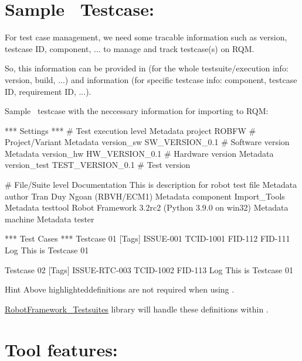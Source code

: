 \hypertarget{description-sample-robotframework-testcase}{%
\section{Sample \rfwcore\ Testcase:}
\label{description-sample-robotframework-testcase}}

For test case management, we need some tracable information such as
version, testcase ID, component, ... to manage and track testcase(s) on
RQM.

So, this information can be provided in  (for the whole
testsuite/execution info: version, build, ...) and \rcode{{[}Tags{]}}
information (for specific testcase info: component, testcase ID,
requirement ID, ...).

Sample \rfwcore\ testcase with the neccessary information for importing to
RQM:

\begin{robotcode}[caption=Sample \rfwcore\ testcase,
                  linebackgroundcolor=\hlcode{3,4,5,6,12,13,14}]
*** Settings ***
# Test execution level
Metadata   project        ROBFW              # Project/Variant
Metadata   version_sw     SW_VERSION_0.1     # Software version
Metadata   version_hw     HW_VERSION_0.1     # Hardware version
Metadata   version_test   TEST_VERSION_0.1   # Test version

# File/Suite level
Documentation             This is description for robot test file
Metadata    author        Tran Duy Ngoan (RBVH/ECM1)
Metadata    component     Import_Tools
Metadata    testtool      Robot Framework 3.2rc2 (Python 3.9.0 on win32)
Metadata    machine       %
Metadata    tester        %

*** Test Cases ***
Testcase 01
   [Tags]   ISSUE-001   TCID-1001   FID-112   FID-111
   Log       This is Testcase 01

Testcase 02
   [Tags]   ISSUE-RTC-003   TCID-1002   FID-113
   Log       This is Testcase 01
\end{robotcode}

\begin{boxhint} {Hint}
Above highlighteddefinitions are not required when using \rfw.

\href{https://github.com/test-fullautomation/robotframework-testsuitesmanagement}{RobotFramework\_Testsuites}
library will handle these definitions within .
\end{boxhint}

\hypertarget{description-tool-features}{%
\section{Tool features:}\label{description-tool-features}}
